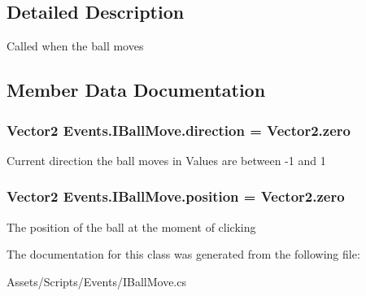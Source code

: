 \subsection{Detailed Description}
Called when the ball moves 



\subsection{Member Data Documentation}
\subsubsection[{\texorpdfstring{direction}{direction}}]{\setlength{\rightskip}{0pt plus 5cm}Vector2 Events.\+I\+Ball\+Move.\+direction = Vector2.\+zero}\hypertarget{class_events_1_1_i_ball_move_aaa7ee0633897f9e4e56467a46d56e3cc}{}\label{class_events_1_1_i_ball_move_aaa7ee0633897f9e4e56467a46d56e3cc}


Current direction the ball moves in Values are between -\/1 and 1 

\subsubsection[{\texorpdfstring{position}{position}}]{\setlength{\rightskip}{0pt plus 5cm}Vector2 Events.\+I\+Ball\+Move.\+position = Vector2.\+zero}\hypertarget{class_events_1_1_i_ball_move_a15ca83aec7e67497dd36c046fca0bbd7}{}\label{class_events_1_1_i_ball_move_a15ca83aec7e67497dd36c046fca0bbd7}


The position of the ball at the moment of clicking 



The documentation for this class was generated from the following file\+:\begin{DoxyCompactItemize}
\item 
Assets/\+Scripts/\+Events/I\+Ball\+Move.\+cs\end{DoxyCompactItemize}
